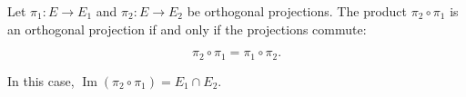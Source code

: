 Let $\pi_1: E \rightarrow E_1$ and $\pi_2: E \rightarrow E_2$ be orthogonal projections. The product $\pi_2 \circ \pi_1$ is an orthogonal projection if and only if the projections commute:

$$\pi_2 \circ \pi_1 = \pi_1 \circ \pi_2.$$

In this case, $\operatorname{Im}(\pi_2 \circ \pi_1) = E_1 \cap E_2$.
